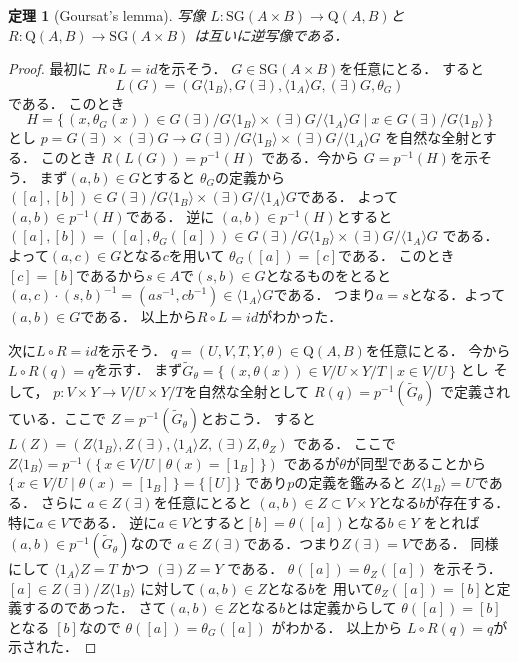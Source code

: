 \documentclass[leqno]{jsarticle}
\newtheorem{thm}{定理}
\newcommand{\myproja}[1]{(\exists)#1}
\newcommand{\myprojb}[1]{#1(\exists)}
\newcommand{\mysliceb}[2]{#1\langle #2\rangle}
\newcommand{\myslicea}[2]{\langle #2\rangle#1}
\newcommand{\myqq}[2]{\mathrm{Q}(#1, #2)}
\newcommand{\mysg}[1]{\mathrm{SG}(#1)}
\newcommand{\mymapl}{L}
\newcommand{\mymapr}{R}
\begin{document}
\begin{thm}[Goursat's lemma]\label{thm:main0}
写像
$\mymapl:\mysg{A\times B}\to \myqq{A}{B}$と
$\mymapr\colon \myqq{A}{B}\to \mysg{A\times B}$
は互いに逆写像である．
\end{thm}
\begin{proof}
最初に
$\mymapr\circ \mymapl=id$を示そう．
$G\in \mysg{A\times B}$を任意にとる．
すると
\[
\mymapl(G)=(\mysliceb{G}{1_{B}}, \myprojb{G}, \myslicea{G}{1_{A}}, \myproja{G}, \theta_{G})
\]
である．
このとき
\[
H=\{\, (x, \theta_{G}(x))
\in \myprojb{G}/\mysliceb{G}{1_{B}}\times \myproja{G}/\myslicea{G}{1_{A}}
\mid x\in \myprojb{G}/\mysliceb{G}{1_{B}} \,  \}
\]
とし
$p=\myprojb{G}\times \myproja{G}\to 
\myprojb{G}/\mysliceb{G}{1_{B}}\times \myproja{G}/\myslicea{G}{1_{A}}
$
を自然な全射とする．
このとき
$R(L(G))=p^{-1}(H)$
である．今から
$G=p^{-1}(H)$を示そう．
まず$(a, b)\in G$とすると
$\theta_{G}$の定義から
$([a], [b])\in \myprojb{G}/\mysliceb{G}{1_{B}}\times \myproja{G}/\myslicea{G}{1_{A}}
$である．
よって
$(a, b)\in p^{-1}(H)$である．
逆に
$(a, b)\in p^{-1}(H)$とすると
$([a], [b])=([a], \theta_{G}([a]))\in\myprojb{G}/\mysliceb{G}{1_{B}}\times \myproja{G}/\myslicea{G}{1_{A}}
$
である．よって$(a, c)\in G$となる$c$を用いて
$\theta_{G}([a])=[c]$である．
このとき$[c]=[b]$であるから$s\in A$で$(s, b)\in G$となるものをとると$(a, c)\cdot (s, b)^{-1}=(as^{-1}, cb^{-1})\in 
\myslicea{G}{1_{A}}$である．
つまり$a=s$となる．よって$(a, b)\in G$である．
以上から$\mymapr\circ \mymapl=id$がわかった．

次に$\mymapl\circ \mymapr=id$を示そう．
$q=(U, V, T, Y, \theta)\in \myqq{A}{B}$を任意にとる．
今から$\mymapl\circ \mymapr(q)=q$を示す．
まず$\widetilde{G}_{\theta}=\{\, (x, \theta(x))\in V/U\times Y/T \mid x\in V/U\, \}$
とし
そして，
$p\colon V\times Y\to V/U\times Y/T$を自然な全射として
$\mymapr(q)=p^{-1}\left(\widetilde{G}_{\theta}\right)$
で定義されている．ここで
$Z=p^{-1}\left(\widetilde{G}_{\theta}\right)$とおこう．
すると
$\mymapl(Z)=(\mysliceb{Z}{1_{B}}, \myprojb{Z}, 
\myslicea{Z}{1_{A}},  \myproja{Z}, \theta_{Z})$
である．
ここで
$\mysliceb{Z}{1_{B}}=p^{-1}(\{\, x\in V/U\mid \theta(x)=[1_{B}]\, \})$
であるが$\theta$が同型であることから
$\{\, x\in V/U\mid \theta(x)=[1_{B}]\, \}=\{[U]\}$
であり$p$の定義を鑑みると
$\mysliceb{Z}{1_{B}}=U$である．
さらに
$a\in \myprojb{Z}$を任意にとると
$(a, b)\in Z\subset V\times Y$となる$b$が存在する．
特に$a\in V$である．
逆に$a\in V$とすると$[b]=\theta([a])$となる$b\in Y$
をとれば$(a, b)\in p^{-1}(\widetilde{G}_{\theta})$なので
$a\in \myprojb{Z}$である．つまり$\myprojb{Z}=V$である．
同様にして
$\myslicea{Z}{1_{A}}=T$
かつ
$\myproja{Z}=Y$
である．
$\theta([a])=\theta_{Z}([a])$
を示そう．
$[a]\in \myprojb{Z}/\mysliceb{Z}{1_{B}}$
に対して$(a, b)\in Z$となる$b$を
用いて$\theta_{Z}([a])=[b]$と定義するのであった．
さて$(a, b)\in Z$となる$b$とは定義からして
$\theta([a])=[b]$となる
$[b]$なので
$\theta([a])=\theta_{G}([a])$
がわかる．
以上から
$\mymapl\circ \mymapr(q)=q$が示された．
\end{proof}
\end{document}
